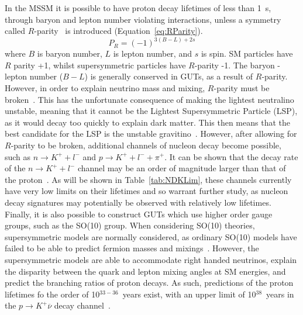 In the MSSM it is possible to have proton decay lifetimes of less than 1~s, through baryon and lepton number violating interactions, unless a symmetry called $R$-parity~\citep{FARRAR1978575} is introduced (Equation~\ref{eq:RParity}).
\begin{equation}
  \label{eq:RParity}
  P_{R} = (-1)^{3(B-L)+2s}
\end{equation}
where $B$ is baryon number, $L$ is lepton number, and $s$ is spin. SM particles have $R$ parity +1, whilst supersymmetric particles have $R$-parity -1. The baryon - lepton number ($B-L$) is generally conserved in GUTs, as a result of $R$-parity. However, in order to explain neutrino mass and mixing, $R$-parity must be broken~\citep{Senjanovic:2009kr}. This has the unfortunate consequence of making the lightest neutralino unstable, meaning that it cannot be the Lightest Supersymmetric Particle (LSP), as it would decay too quickly to explain dark matter. This then means that the best candidate for the LSP is the unstable gravitino~\citep{Senjanovic:2009kr}. However, after allowing for $R$-parity to be broken, additional channels of nucleon decay become possible, such as $n \rightarrow K^{+} + l^{-}$ and $p \rightarrow K^{+} + l^{-} + \pi^{+}$. It can be shown that the decay rate of the $n \rightarrow K^{+} + l^{-}$ channel may be an order of magnitude larger than that of the proton~\citep{Senjanovic:2009kr, Vissani:1995hp}. As will be shown in Table~\ref{tab:NDKLim}, these channels currently have very low limits on their lifetimes and so warrant further study, as nucleon decay signatures may potentially be observed with relatively low lifetimes. \\

Finally, it is also possible to construct GUTs which use higher order gauge groups, such as the SO(10) group. When considering SO(10) theories, supersymmetric models are normally considered, as ordinary SO(10) models have failed to be able to predict fermion masses and mixings~\citep{Senjanovic:2009kr}. However, the supersymmetric models are able to accommodate right handed neutrinos, explain the disparity between the quark and lepton mixing angles at SM energies, and predict the branching ratios of proton decays. As such, predictions of the proton lifetimes fo the order of 10$^{33-36}$~years exist, with an upper limit of 10$^{38}$~years in the $p \rightarrow K^{+} \overline{\nu}$ decay channel~\citep{Severson:2015dta}. \\

